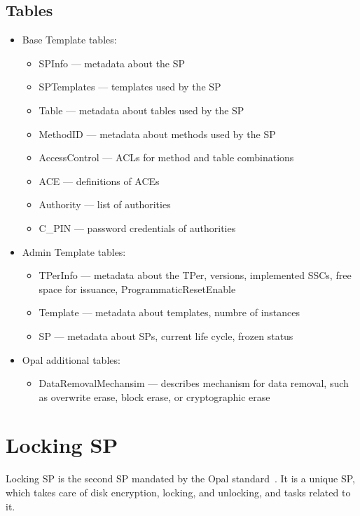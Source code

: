 \subsection{Tables}

\begin{itemize}
    \item Base Template tables:
\begin{itemize}
    \item SPInfo --- metadata about the SP
    \item SPTemplates --- templates used by the SP
    \item Table --- metadata about tables used by the SP
    \item MethodID --- metadata about methods used by the SP
    \item AccessControl --- ACLs for method and table combinations
    \item ACE --- definitions of ACEs
    \item Authority --- list of authorities
    \item C\_PIN --- password credentials of authorities
\end{itemize}
    \item Admin Template tables:
\begin{itemize}
    \item TPerInfo --- metadata about the TPer, versions, implemented SSCs, free space for issuance, ProgrammaticResetEnable
    \item Template --- metadata about templates, numbre of instances
    \item SP --- metadata about SPs, current life cycle, frozen status
\end{itemize}
    \item Opal additional tables:
\begin{itemize}
\item DataRemovalMechansim --- describes mechanism for data removal, such as overwrite erase, block erase, or cryptographic erase
\end{itemize}
\end{itemize}


\section{Locking SP}
\label{locking_sp}

Locking SP is the second SP mandated by the Opal standard~\cite{tcg-opal2}. It is a unique SP, which takes care of disk encryption, locking, and unlocking, and tasks related to it.

